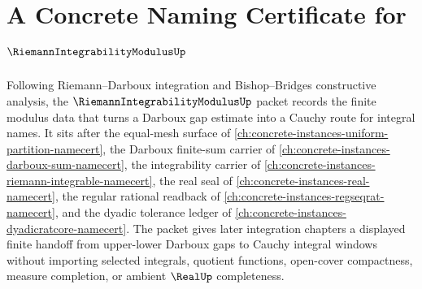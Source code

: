 \chapter{A Concrete Naming Certificate for $\RiemannIntegrabilityModulusUp$}
\label{ch:concrete-instances-riemann-integrability-modulus-namecert}

Following Riemann--Darboux integration and Bishop--Bridges constructive analysis, the $\RiemannIntegrabilityModulusUp$ packet records the finite modulus data that turns a Darboux gap estimate into a Cauchy route for integral names. It sits after the equal-mesh surface of \autoref{ch:concrete-instances-uniform-partition-namecert}, the Darboux finite-sum carrier of \autoref{ch:concrete-instances-darboux-sum-namecert}, the integrability carrier of \autoref{ch:concrete-instances-riemann-integrable-namecert}, the real seal of \autoref{ch:concrete-instances-real-namecert}, the regular rational readback of \autoref{ch:concrete-instances-regseqrat-namecert}, and the dyadic tolerance ledger of \autoref{ch:concrete-instances-dyadicratcore-namecert}. The packet gives later integration chapters a displayed finite handoff from upper-lower Darboux gaps to Cauchy integral windows without importing selected integrals, quotient functions, open-cover compactness, measure completion, or ambient $\RealUp$ completeness.

